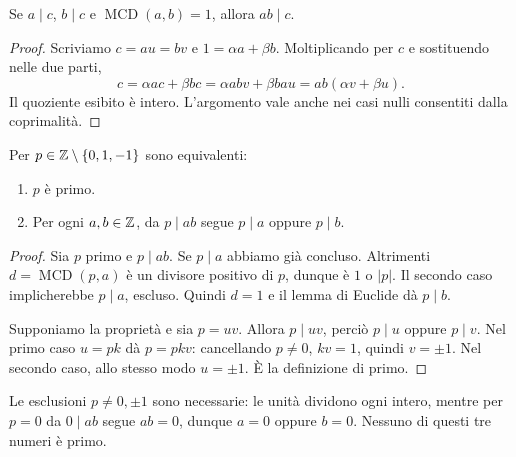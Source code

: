 \begin{corollario}
Se $a\mid c$, $b\mid c$ e $\operatorname{MCD}(a,b)=1$, allora $ab\mid c$.
\end{corollario}
\begin{proof}
Scriviamo $c=au=bv$ e $1=\alpha a+\beta b$. Moltiplicando per $c$ e sostituendo nelle due parti,
\[
c=\alpha ac+\beta bc=\alpha abv+\beta bau=ab(\alpha v+\beta u).
\]
Il quoziente esibito è intero. L'argomento vale anche nei casi nulli consentiti dalla coprimalità.
\end{proof}

\begin{proposizione}\label{prop:primo-prodotto}
Per $p\in\mathbb{Z}\setminus\{0,1,-1\}$ sono equivalenti:
\begin{enumerate}[label=\arabic*.]
\item $p$ è primo.
\item Per ogni $a,b\in\mathbb{Z}$, da $p\mid ab$ segue $p\mid a$ oppure $p\mid b$.
\end{enumerate}
\end{proposizione}
\begin{proof}
 Sia $p$ primo e $p\mid ab$. Se $p\mid a$ abbiamo già concluso. Altrimenti $d=\operatorname{MCD}(p,a)$ è un divisore positivo di $p$, dunque è $1$ o $|p|$. Il secondo caso implicherebbe $p\mid a$, escluso. Quindi $d=1$ e il lemma di Euclide dà $p\mid b$.

 Supponiamo la proprietà e sia $p=uv$. Allora $p\mid uv$, perciò $p\mid u$ oppure $p\mid v$. Nel primo caso $u=pk$ dà $p=pkv$: cancellando $p\ne0$, $kv=1$, quindi $v=\pm1$. Nel secondo caso, allo stesso modo $u=\pm1$. È la definizione di primo.
\end{proof}

\begin{osservazione}
Le esclusioni $p\ne0,\pm1$ sono necessarie: le unità dividono ogni intero, mentre per $p=0$ da $0\mid ab$ segue $ab=0$, dunque $a=0$ oppure $b=0$. Nessuno di questi tre numeri è primo.
\end{osservazione}

